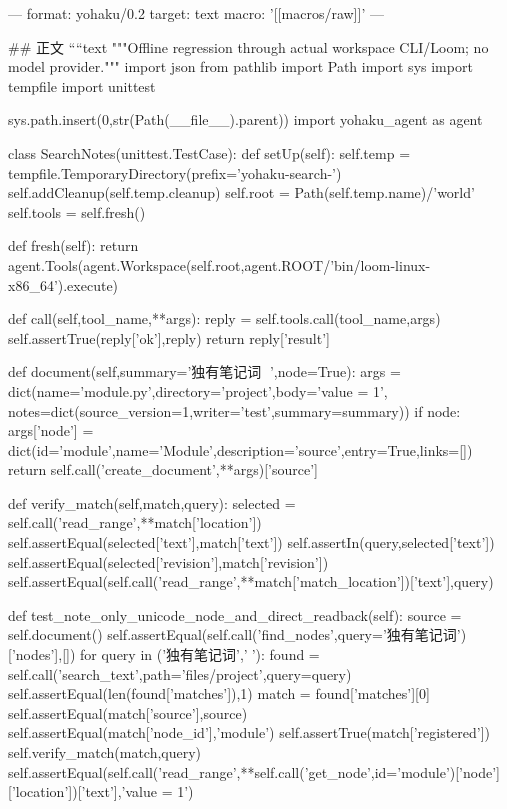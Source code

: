 ---
format: yohaku/0.2
target: text
macro: '[[macros/raw]]'
---

## 正文
````text
"""Offline regression through actual workspace CLI/Loom; no model provider."""
import json
from pathlib import Path
import sys
import tempfile
import unittest

sys.path.insert(0,str(Path(__file__).parent))
import yohaku_agent as agent


class SearchNotes(unittest.TestCase):
    def setUp(self):
        self.temp = tempfile.TemporaryDirectory(prefix='yohaku-search-')
        self.addCleanup(self.temp.cleanup)
        self.root = Path(self.temp.name)/'world'
        self.tools = self.fresh()

    def fresh(self):
        return agent.Tools(agent.Workspace(self.root,agent.ROOT/'bin/loom-linux-x86_64').execute)

    def call(self,tool_name,**args):
        reply = self.tools.call(tool_name,args)
        self.assertTrue(reply['ok'],reply)
        return reply['result']

    def document(self,summary='独有笔记词 🧸',node=True):
        args = dict(name='module.py',directory='project',body='value = 1\n',
                    notes=dict(source_version=1,writer='test',summary=summary))
        if node:
            args['node'] = dict(id='module',name='Module',description='source',entry=True,links=[])
        return self.call('create_document',**args)['source']

    def verify_match(self,match,query):
        selected = self.call('read_range',**match['location'])
        self.assertEqual(selected['text'],match['text'])
        self.assertIn(query,selected['text'])
        self.assertEqual(selected['revision'],match['revision'])
        self.assertEqual(self.call('read_range',**match['match_location'])['text'],query)

    def test_note_only_unicode_node_and_direct_readback(self):
        source = self.document()
        self.assertEqual(self.call('find_nodes',query='独有笔记词')['nodes'],[])
        for query in ('独有笔记词','🧸'):
            found = self.call('search_text',path='files/project',query=query)
            self.assertEqual(len(found['matches']),1)
            match = found['matches'][0]
            self.assertEqual(match['source'],source)
            self.assertEqual(match['node_id'],'module')
            self.assertTrue(match['registered'])
            self.verify_match(match,query)
        self.assertEqual(self.call('read_range',**self.call('get_node',id='module')['node']['location'])['text'],'value = 1\n')


